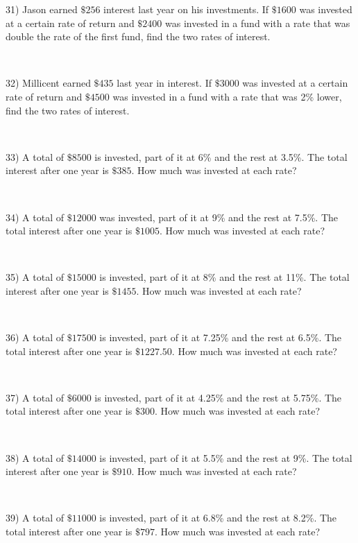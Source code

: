 31) Jason earned $\$256$ interest last year on his investments. If
$\$1600$ was invested at a certain rate of return and
$\$2400$ was invested in a fund with a rate that  was
double the rate of the first fund, find the two rates of interest.\par
~\par

32) Millicent earned $\$435$ last year in interest. If
$\$3000$ was invested at a certain  rate of return and
$\$4500$ was invested in a fund with a rate that was 2\% lower, find the two rates of interest.\par
~\par

33) A total of $\$8500$ is invested, part of it at 6\% and the rest
at 3.5\%. The total interest after one year is $\$385$.
How much was invested at each rate?\par
~\par

34) A total of $\$12000$ was invested, part of it at 9\% and the rest
at 7.5\%. The total interest after one year is
$\$1005$. How much was invested at each rate?\par
~\par

35) A total of $\$15000$ is invested, part of it at 8\% and the rest
at 11\%. The total  interest after one year is $\$1455$.
How much was invested at each rate?\par
~\par

36) A total of $\$17500$ is invested, part of it at 7.25\% and the
rest at 6.5\%. The total interest after one year is
$\$1227.50$. How much was invested at each rate?\par
~\par

37) A total of $\$6000$ is invested, part of it at 4.25\% and the
rest at 5.75\%. The total interest after one year is
$\$300$. How much was invested at each rate?\par
~\par

38) A total of $\$14000$ is invested, part of it at 5.5\% and the
rest at 9\%. The total interest after one year is $\$910$.
How much was invested at each rate?\par
~\par

39) A total of $\$11000$ is invested, part of it at 6.8\% and the
rest at 8.2\%. The total interest after one year is
$\$797$. How much was invested at each rate?\par
~\par

